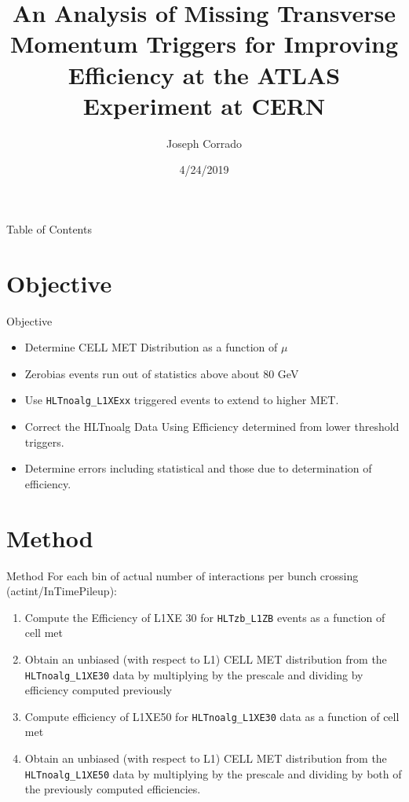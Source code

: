 \documentclass[]{beamer}
\title{An Analysis of Missing Transverse Momentum Triggers for Improving Efficiency at the ATLAS Experiment at CERN}
\author{Joseph Corrado}                 %
\institute{New York University}      %
\date{4/24/2019}                    %
\begin{document}
\begin{frame}
  \titlepage
\end{frame}
\begin{frame}{Table of Contents}
        \tableofcontents
\end{frame}
\section{Objective}
\begin{frame}{Objective}
\begin{itemize}
        \item Determine CELL MET Distribution as a function of $\mu$
        \item Zerobias events run out of statistics above about 80 GeV
        \item Use \texttt{HLTnoalg\_L1XExx} triggered events to extend to higher MET.
        \item Correct the HLTnoalg Data Using Efficiency determined from lower threshold triggers.
        \item Determine errors including statistical and those due to determination of efficiency.
\end{itemize}
\end{frame}
\section{Method}
\begin{frame}{Method}
For each bin of actual number of interactions per bunch crossing (actint/InTimePileup):
\begin{enumerate}
        \item Compute the Efficiency of L1XE 30 for \texttt{HLTzb\_L1ZB} events as a function of cell met
        \item Obtain an unbiased (with respect to L1) CELL MET distribution from the \texttt{HLTnoalg\_L1XE30} data by multiplying by the prescale and dividing by efficiency computed previously
        \item Compute efficiency of L1XE50 for \texttt{HLTnoalg\_L1XE30} data as a function of cell met
        \item Obtain an unbiased (with respect to L1) CELL MET distribution from the \texttt{HLTnoalg\_L1XE50} data by multiplying by the prescale and dividing by both of the previously computed efficiencies.
\end{enumerate}
\end{frame}
\end{document}
